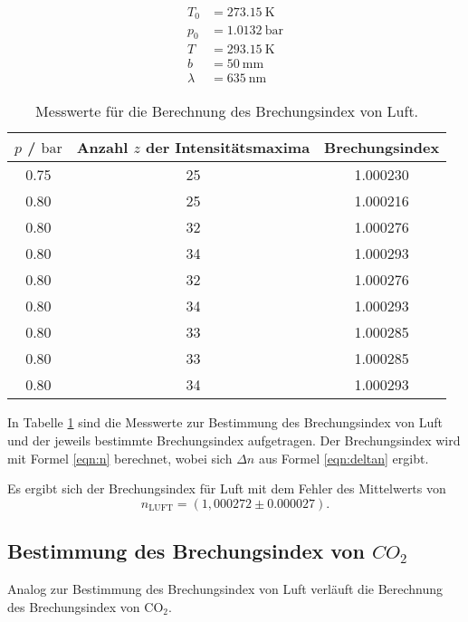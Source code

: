 \begin{align}
	T_0 &= \SI{273,15}{\kelvin} \\
	p_0 &= \SI{1,0132}{\bar}  \\
	T &= \SI{293,15}{\kelvin} \\
	b &= \SI{50}{\milli\meter} \\
	\lambda &= \SI{635}{\nano\meter}
\end{align}



\begin{table}
	\caption{Messwerte für die Berechnung des Brechungsindex von Luft.}
	\label{tab:luftbrech}
	\centering
	\begin{tabular}{ccc}
	\toprule
	$p$ / $\si{\bar}$ & Anzahl $z$ der Intensitätsmaxima & Brechungsindex \\
	\midrule
		0.75 & 25 & 1.000230 \\
		0.80 & 25 & 1.000216 \\
		0.80 & 32 & 1.000276 \\
		0.80 & 34 & 1.000293 \\
		0.80 & 32 & 1.000276 \\
		0.80 & 34 & 1.000293 \\
		0.80 & 33 & 1.000285 \\
		0.80 & 33 & 1.000285 \\
		0.80 & 34 & 1.000293 \\
	\bottomrule
	\end{tabular}
\end{table}

In Tabelle \ref{tab:luftbrech} sind die Messwerte zur Bestimmung des Brechungsindex von Luft
und der jeweils bestimmte Brechungsindex aufgetragen.
Der Brechungsindex wird mit Formel \eqref{eqn:n} berechnet, wobei sich $\Delta n$ aus Formel
\eqref{eqn:deltan} ergibt.

Es ergibt sich der Brechungsindex für Luft mit dem Fehler des Mittelwerts von
\begin{equation}
	n_{\mathrm{LUFT}} = (1,000272 \pm 0.000027) \mathrm{.}
\end{equation}


\subsection{Bestimmung des Brechungsindex von \texorpdfstring{$CO_2$}{math} }

Analog zur Bestimmung des Brechungsindex von Luft verläuft die Berechnung des
Brechungsindex von CO$_2$.

